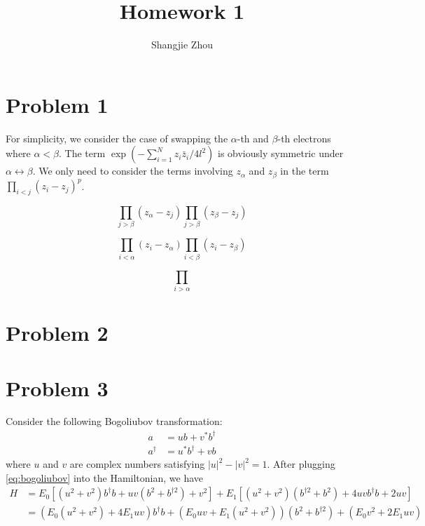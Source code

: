 \documentclass{article}
\title{Homework 1}
\author{Shangjie Zhou}
\begin{document}
\maketitle


\section*{Problem 1}
For simplicity, we consider the case of swapping the $\alpha$-th and $\beta$-th electrons where $\alpha<\beta$.
The term $\exp(-\sum_{i=1}^Nz_i \bar{z}_i/4l^2)$ is obviously symmetric under $\alpha\leftrightarrow \beta$.
We only need to consider the terms involving $z_\alpha$ and $z_\beta$ in the term $\prod_{i<j}(z_i-z_j)^p$.

\begin{equation*}
    \prod_{j>\beta}(z_\alpha-z_j)\prod_{j>\beta}(z_\beta-z_j)
\end{equation*}


\begin{equation}
    \prod_{i<\alpha}(z_i-z_\alpha)\prod_{i<\beta}(z_i-z_\beta)
\end{equation}

\begin{equation}
    \prod_{i>\alpha}
\end{equation}

\section*{Problem 2}


\section*{Problem 3}
Consider the following Bogoliubov transformation:
\begin{subequations}\label{eq:bogoliubov}
    \begin{align}
        a&=ub+v^*b^\dagger\\
        a^\dagger&=u^*b^\dagger+vb
    \end{align}
\end{subequations}
where $u$ and $v$ are complex numbers satisfying $|u|^2-|v|^2=1$.
After plugging \cref{eq:bogoliubov} into the Hamiltonian, we have
\begin{equation}
    \begin{split}
        H&=E_0\left[(u^2+v^2)b^\dagger b+uv(b^2+b^{\dagger 2})+v^2\right]+E_1\left[(u^2+v^2)(b^{\dagger 2}+b^2)+4uvb^\dagger b+2uv\right]\\
         &= (E_0(u^2+v^2)+4E_1uv)b^\dagger b+(E_0uv+E_1(u^2+v^2))(b^2+b^{\dagger 2})+(E_0v^2+2E_1uv)
    \end{split}
\end{equation}
\end{document}
